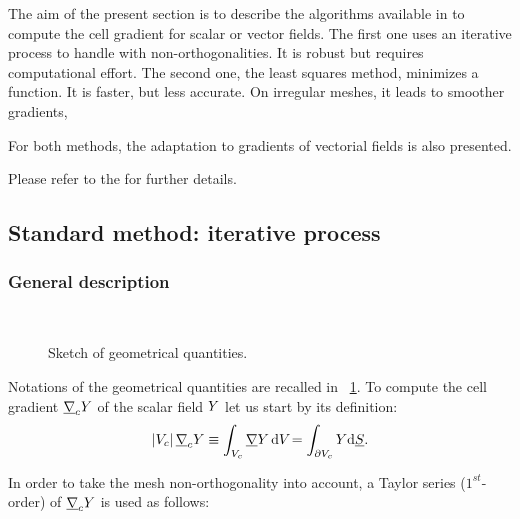 \hypertarget{gradreco}{}

The aim of the present section is to describe the algorithms available in \CS
to compute the cell gradient for scalar or vector fields. The first one uses an
iterative process to handle with non-orthogonalities. It is robust but requires
computational effort. The second one, the least squares method, minimizes a
function. It is faster, but less accurate. On irregular meshes, it leads to
smoother gradients,

For both methods, the adaptation to gradients of vectorial fields is also presented.

Please refer to the  for further details.

\subsection{Standard method: iterative process}\label{sec:spadis:iteratif_gradient}


\subsubsection{General description}
\begin{figure}[!htbp]
\centering
\mbox{
 \,
}
\caption{\label{fig:geom_gradrc}
Sketch of geometrical quantities.
}
\end{figure}

Notations of the geometrical quantities are recalled in \figurename~\ref{fig:geom_gradrc}.
To compute the cell gradient $\underline{\nabla}_{c} Y $ of the scalar field $Y$ let us
start by its definition:
\begin{equation}
\left| V_{c} \right| \underline{\nabla}_{c} Y \equiv  \displaystyle \int_{V_{c}}{\underline{\nabla} Y \, \mathrm{d} V_{} } = \int_{\partial V_{c}} Y \mathrm{d} \underline{S}.
\end{equation}


In order to take the mesh non-orthogonality into account, a Taylor series ($1^{st}$-order) of $\underline{\nabla}_{c} Y$ is used as follows:

